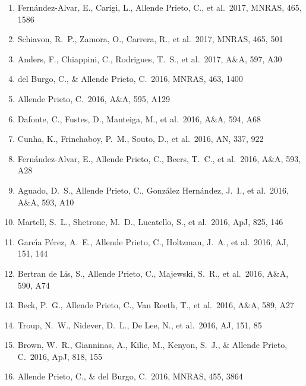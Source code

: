 \documentclass[12pt]{article}
\begin{document}
\begin{enumerate}

\item Fern{\'a}ndez-Alvar, E., Carigi, L., Allende Prieto, C., et al.\ 2017, MNRAS, 465, 1586 


\item Schiavon, R.~P., Zamora, O., Carrera, R., et al.\ 2017, MNRAS, 465, 501 


\item Anders, F., Chiappini, C., Rodrigues, T.~S., et al.\ 2017, A\&A, 597, A30 


\item del Burgo, C., \& Allende Prieto, C.\ 2016, MNRAS, 463, 1400 


\item Allende Prieto, C.\ 2016, A\&A, 595, A129 


\item Dafonte, C., Fustes, D., Manteiga, M., et al.\ 2016, A\&A, 594, A68 


\item Cunha, K., Frinchaboy, P.~M., Souto, D., et al.\ 2016, AN, 337, 922 


\item Fern{\'a}ndez-Alvar, E., Allende Prieto, C., Beers, T.~C., et al.\ 2016, A\&A, 593, A28 


\item Aguado, D.~S., Allende Prieto, C., Gonz{\'a}lez Hern{\'a}ndez, J.~I., et al.\ 2016, A\&A, 593, A10 


\item Martell, S.~L., Shetrone, M.~D., Lucatello, S., et al.\ 2016, ApJ, 825, 146 


\item Garc{\'{\i}}a P{\'e}rez, A.~E., Allende Prieto, C., Holtzman, J.~A., et al.\ 2016, AJ, 151, 144 


\item Bertran de Lis, S., Allende Prieto, C., Majewski, S.~R., et al.\ 2016, A\&A, 590, A74 


\item Beck, P.~G., Allende Prieto, C., Van Reeth, T., et al.\ 2016, A\&A, 589, A27 


\item Troup, N.~W., Nidever, D.~L., De Lee, N., et al.\ 2016, AJ, 151, 85 


\item Brown, W.~R., Gianninas, A., Kilic, M., Kenyon, S.~J., \& Allende Prieto, C.\ 2016, ApJ, 818, 155 


\item Allende Prieto, C., \& del Burgo, C.\ 2016, MNRAS, 455, 3864 



\end{enumerate}
\end{document}
